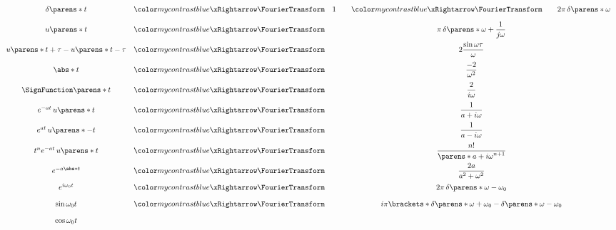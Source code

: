 \begin{multicols}{2}
\begin{CheatsheetEntryFrame}
        \begin{equation*}
            \begin{array}{ccc}
                \delta\parens*{t}
                &\TmpFTArrow&
                1
                \qquad\TmpFTArrow\qquad
                2 \pi \, \delta\parens*{\omega}
                \\[1em]
                u\parens*{t}
                &\TmpFTArrow&
                \displaystyle
                \pi \, \delta\parens*{\omega} + \frac{1}{j \omega}
                \\[1em]
                u\parens*{t + \tau} - u\parens*{t - \tau}
                &\TmpFTArrow&
                \displaystyle
                2 \frac{\sin{\omega \tau}}{\omega}
                \\[1em]
                \abs*{t}
                &\TmpFTArrow&
                \displaystyle
                \frac{- 2}{\omega^2}
                \\[1em]
                \SignFunction\parens*{t}
                &\TmpFTArrow&
                \displaystyle
                \frac{2}{i \omega}
                \\[1em]
                e^{-a t} \, u\parens*{t}
                &\TmpFTArrow&
                \displaystyle
                \frac{1}{a + i \omega}
                \\[1em]
                e^{a t} \, u\parens*{-t}
                &\TmpFTArrow&
                \displaystyle
                \frac{1}{a - i \omega}
                \\[1em]
                t^n e^{-a t} \, u\parens*{t}
                &\TmpFTArrow&
                \displaystyle
                \frac{n!}{\parens*{a + i \omega}^{n + 1}}
                \\[1em]
                e^{-a \abs*{t}}
                &\TmpFTArrow&
                \displaystyle
                \frac{2 a}{a^2 + \omega^2}
                \\[1em]
                e^{i \omega_0 t}
                &\TmpFTArrow&
                2 \pi \, \delta\parens*{\omega - \omega_0}
                \\[1em]
                \sin{\omega_0 t}
                &\TmpFTArrow&
                i \pi \brackets*{
                    \delta\parens*{\omega + \omega_0}
                    - \delta\parens*{\omega - \omega_0}
                }
                \\[1em]
                \cos{\omega_0 t}

\end{array}
\end{equation*}
\end{CheatsheetEntryFrame}
\end{multicols}
